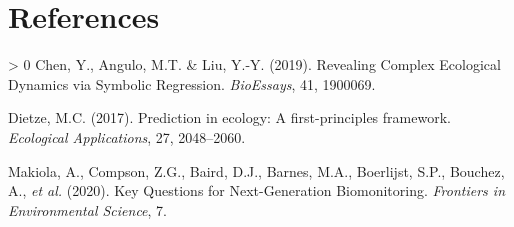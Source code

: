 \documentclass[10pt,oneside]{article}
\newlength{\cslhangindent}
\newenvironment{CSLReferences}[3] %
 {%
  \setlength{\parindent}{0pt}
  \ifodd #1 \everypar{\setlength{\hangindent}{\cslhangindent}}\ignorespaces\fi
  \ifnum #2 > 0
  \setlength{\parskip}{#2\baselineskip}
  \fi
 }%
 {}
\begin{document}
\hypertarget{references}{%
\section*{References}\label{references}}

\hypertarget{refs}{}
\begin{CSLReferences}{1}{0}
\leavevmode\hypertarget{ref-Chen2019RevCom}{}%
Chen, Y., Angulo, M.T. \& Liu, Y.-Y. (2019). Revealing Complex
Ecological Dynamics via Symbolic Regression. \emph{BioEssays}, 41,
1900069.

\leavevmode\hypertarget{ref-Dietze2017PreEco}{}%
Dietze, M.C. (2017). Prediction in ecology: A first-principles
framework. \emph{Ecological Applications}, 27, 2048--2060.

\leavevmode\hypertarget{ref-Makiola2020KeyQue}{}%
Makiola, A., Compson, Z.G., Baird, D.J., Barnes, M.A., Boerlijst, S.P.,
Bouchez, A., \emph{et al.} (2020). Key Questions for Next-Generation
Biomonitoring. \emph{Frontiers in Environmental Science}, 7.

\end{CSLReferences}
\end{document}
